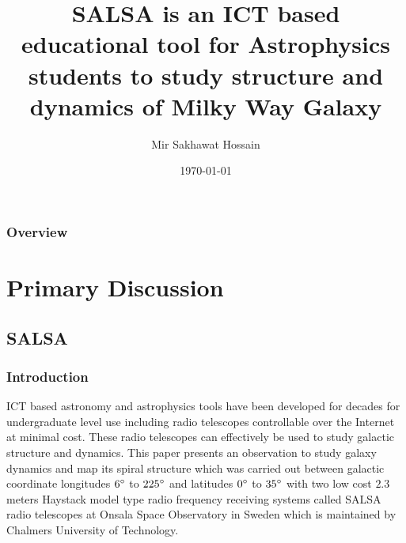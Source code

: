 \documentclass{beamer}
\title[SALSA]{SALSA is an ICT based educational tool for Astrophysics students to study structure and dynamics of Milky Way Galaxy } %
\author{Mir Sakhawat Hossain} %
\institute[KNGC] %
{
Kabi Nazrul Govt. College,Dhaka \\ %
\medskip
\textit{s.hossain18@gmail.com} \\ %
\textit{\url{https://gitlab.com/sakhawat18/iccit-2018}} %
}
\date{\today} %
\begin{document}
\begin{frame}
\titlepage %
\end{frame}

\begin{frame}
\frametitle{Overview} %
\tableofcontents %
\end{frame}


\section{Primary Discussion} %

\subsection{SALSA} %

\begin{frame}
\frametitle{Introduction}
ICT based astronomy and astrophysics tools have been developed for decades for undergraduate level use including radio telescopes controllable over the Internet at minimal cost. These radio telescopes can effectively be used to study galactic structure and dynamics. This paper presents an observation to study galaxy dynamics and map its spiral structure which was carried out between galactic coordinate longitudes $6\degree$ to $225\degree$ and latitudes $0\degree$ to $35\degree$ with two low cost $2.3$ meters Haystack model type radio frequency receiving systems called SALSA radio telescopes at Onsala Space Observatory in Sweden which is maintained by Chalmers University of Technology.
\end{frame}
\end{document}
